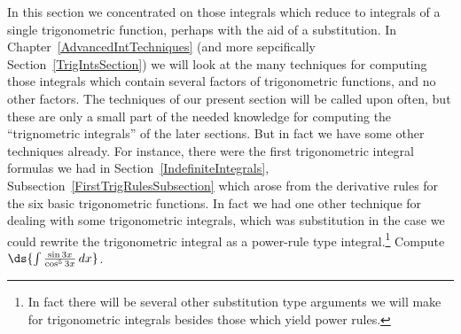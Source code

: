In this section we concentrated on those integrals which reduce
to integrals of a single trigonometric function, perhaps with the
aid of a substitution. In 
Chapter~\ref{AdvancedIntTechniques}
(and more sepcifically Section~\ref{TrigIntsSection})
we will look at the many techniques for computing those integrals 
which contain several factors of trigonometric functions, and no
other factors.  The techniques of our present section will
be called upon often, but these are only a small part of the 
needed knowledge for computing the  ``trignometric integrals''
of the later sections.  But in fact we have some other techniques
already.  For instance, there were the first trigonometric integral
formulas we had in Section~\ref{IndefiniteIntegrals},
Subsection~\ref{FirstTrigRulesSubsection} which arose from
the derivative rules for the six basic trigonometric functions.
In fact we had one other technique for dealing with some trigonometric
integrals, which was substitution in the case we could rewrite
the trigonometric integral as a power-rule type integral.\footnote{%
In fact there will be several other substitution type arguments we
will make for trigonometric integrals besides those which yield power
rules.
}
\bex Compute $\ds{\int\frac{\sin3x}{\cos^53x}\,dx}$.

